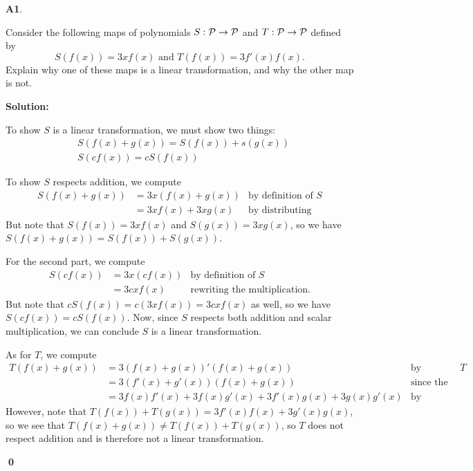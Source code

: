 \documentclass{article}
\newenvironment{problem}[1]
{
  \begin{flushleft}
  \textbf{#1}.
  \ignorespaces
}
{
  \end{flushleft}
}
\newenvironment{solution}
{
  \ignorespaces
  \textbf{Solution:}
}
{
  \ignorespacesafterend
  \begin{flushright}
  {\bfseries \qed}
  \end{flushright}
}
\begin{document}
\begin{problem}{A1}
Consider the following maps of polynomials \(S: \P \rightarrow \P\)
and \(T:\P\rightarrow\P\) defined by
\[S(f(x))= 3xf(x) \text{ and }T(f(x)) = 3f'(x)f(x).\]
Explain why one of these maps is a linear transformation, and why the other
map is not.
\end{problem}
\begin{solution}
To show \(S\) is a linear transformation, we must show two things:
\begin{align*}
&S\left(f(x)+g(x)\right)=S(f(x))+s(g(x)) \\
&S(cf(x)) = cS(f(x))
\end{align*}

To show \(S\) respects addition, we compute
\begin{align*}
S\left(f(x)+g(x)\right) &= 3x\left(f(x)+g(x)\right) & \text{by definition of \(S\)} \\
&= 3xf(x)+3xg(x) & \text{by distributing}
\end{align*}
But note that \(S(f(x))=3xf(x)\) and \(S(g(x))=3xg(x)\), so we have \(S(f(x)+g(x))=S(f(x))+S(g(x))\).

For the second part, we compute
\begin{align*}
S\left(cf(x)\right) &= 3x\left(cf(x)\right) & \text{by definition of \(S\)} \\
&= 3cxf(x) & \text{rewriting the multiplication.}
\end{align*}
But note that \(cS(f(x))=c(3xf(x))=3cxf(x)\) as well, so we have \(S(cf(x))=cS(f(x))\).  Now, since \(S\) respects both addition and scalar multiplication, we can conclude \(S\) is a linear transformation.

As for \(T\), we compute
  \begin{align*}
  T(f(x)+g(x))& =3 (f(x)+g(x))'(f(x)+g(x)) &\text{by definition of \(T\)} \\
  &= 3(f'(x)+g'(x))(f(x)+g(x)) & \text{since the derivative is linear} \\
  &= 3f(x)f'(x)+3f(x)g'(x)+3f'(x)g(x)+3g(x)g'(x) &\text{by distributing}
  \end{align*}
However, note that \(T(f(x))+T(g(x))=3f'(x)f(x)+3g'(x)g(x)\), so we see that \(T(f(x)+g(x)) \neq T(f(x))+T(g(x))\), so \(T\) does not respect addition and is therefore not a linear transformation.
\end{solution}
\end{document}
